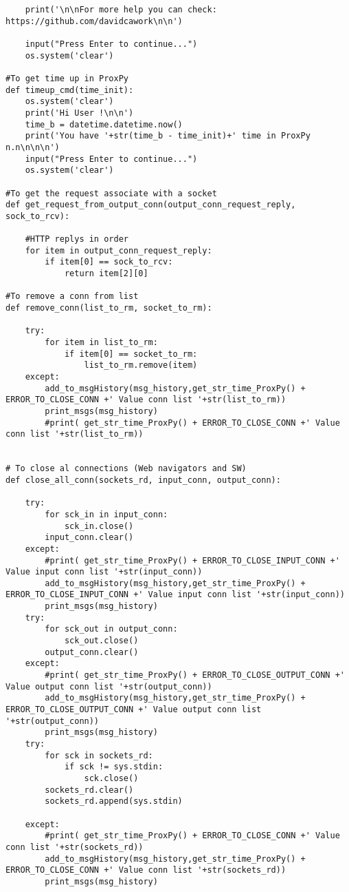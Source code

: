 \begin{verbatim}
    print('\n\nFor more help you can check: https://github.com/davidcawork\n\n')
    
    input("Press Enter to continue...")
    os.system('clear')

#To get time up in ProxPy
def timeup_cmd(time_init):
    os.system('clear')
    print('Hi User !\n\n')
    time_b = datetime.datetime.now()
    print('You have '+str(time_b - time_init)+' time in ProxPy n.n\n\n\n')
    input("Press Enter to continue...")
    os.system('clear')

#To get the request associate with a socket
def get_request_from_output_conn(output_conn_request_reply, sock_to_rcv):

    #HTTP replys in order
    for item in output_conn_request_reply:
        if item[0] == sock_to_rcv:
            return item[2][0]

#To remove a conn from list 
def remove_conn(list_to_rm, socket_to_rm):

    try:
        for item in list_to_rm:
            if item[0] == socket_to_rm:
                list_to_rm.remove(item)
    except:
        add_to_msgHistory(msg_history,get_str_time_ProxPy() + ERROR_TO_CLOSE_CONN +' Value conn list '+str(list_to_rm))
        print_msgs(msg_history)
        #print( get_str_time_ProxPy() + ERROR_TO_CLOSE_CONN +' Value conn list '+str(list_to_rm))


# To close al connections (Web navigators and SW)
def close_all_conn(sockets_rd, input_conn, output_conn):
    
    try:    
        for sck_in in input_conn:
            sck_in.close()
        input_conn.clear()
    except:
        #print( get_str_time_ProxPy() + ERROR_TO_CLOSE_INPUT_CONN +' Value input conn list '+str(input_conn))
        add_to_msgHistory(msg_history,get_str_time_ProxPy() + ERROR_TO_CLOSE_INPUT_CONN +' Value input conn list '+str(input_conn))
        print_msgs(msg_history)
    try:
        for sck_out in output_conn:
            sck_out.close()
        output_conn.clear()
    except:
        #print( get_str_time_ProxPy() + ERROR_TO_CLOSE_OUTPUT_CONN +' Value output conn list '+str(output_conn))
        add_to_msgHistory(msg_history,get_str_time_ProxPy() + ERROR_TO_CLOSE_OUTPUT_CONN +' Value output conn list '+str(output_conn))
        print_msgs(msg_history)
    try:
        for sck in sockets_rd:
            if sck != sys.stdin:
                sck.close()
        sockets_rd.clear()
        sockets_rd.append(sys.stdin)
        
    except:
        #print( get_str_time_ProxPy() + ERROR_TO_CLOSE_CONN +' Value conn list '+str(sockets_rd))
        add_to_msgHistory(msg_history,get_str_time_ProxPy() + ERROR_TO_CLOSE_CONN +' Value conn list '+str(sockets_rd))
        print_msgs(msg_history)


\end{verbatim}
